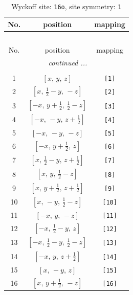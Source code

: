 \documentclass[fleqn,8pt]{jsarticle}
\begin{document}
\begin{longtable}{ccc}
\caption{Wyckoff site: {\tt 16o}, site symmetry: {\tt 1}}
 \\
 \hline \hline
No. & position & mapping \\ \hline \endfirsthead

\multicolumn{2}{l}{\tablename\ \thetable{}} \\
 \hline \hline
No. & position & mapping \\ \hline \endhead

 \hline \hline
\multicolumn{2}{r}{\footnotesize\it continued ...} \\ \endfoot

 \hline \hline
\multicolumn{2}{r}{} \\ \endlastfoot

1 & $\left[ x,\, y,\, z \right]$ & {\tt [1]} \\ \hline
2 & $\left[ x,\, \frac{1}{2} - y,\, - z \right]$ & {\tt [2]} \\ \hline
3 & $\left[ - x,\, y + \frac{1}{2},\, \frac{1}{2} - z \right]$ & {\tt [3]} \\ \hline
4 & $\left[ - x,\, - y,\, z + \frac{1}{2} \right]$ & {\tt [4]} \\ \hline
5 & $\left[ - x,\, - y,\, - z \right]$ & {\tt [5]} \\ \hline
6 & $\left[ - x,\, y + \frac{1}{2},\, z \right]$ & {\tt [6]} \\ \hline
7 & $\left[ x,\, \frac{1}{2} - y,\, z + \frac{1}{2} \right]$ & {\tt [7]} \\ \hline
8 & $\left[ x,\, y,\, \frac{1}{2} - z \right]$ & {\tt [8]} \\ \hline
9 & $\left[ x,\, y + \frac{1}{2},\, z + \frac{1}{2} \right]$ & {\tt [9]} \\ \hline
10 & $\left[ x,\, - y,\, \frac{1}{2} - z \right]$ & {\tt [10]} \\ \hline
11 & $\left[ - x,\, y,\, - z \right]$ & {\tt [11]} \\ \hline
12 & $\left[ - x,\, \frac{1}{2} - y,\, z \right]$ & {\tt [12]} \\ \hline
13 & $\left[ - x,\, \frac{1}{2} - y,\, \frac{1}{2} - z \right]$ & {\tt [13]} \\ \hline
14 & $\left[ - x,\, y,\, z + \frac{1}{2} \right]$ & {\tt [14]} \\ \hline
15 & $\left[ x,\, - y,\, z \right]$ & {\tt [15]} \\ \hline
16 & $\left[ x,\, y + \frac{1}{2},\, - z \right]$ & {\tt [16]} \\
\end{longtable}
\end{document}
